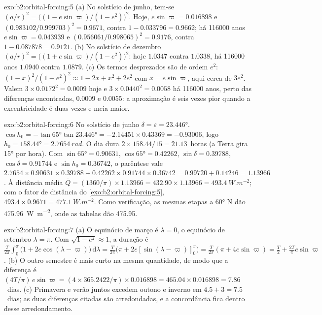\begin{solution}{exo:b2:orbital-forcing:5}
(a) No solstício de junho, tem-se $(a/r)^2 = \bigl((1 - e\sin\varpi)/(1 - e^2)\bigr)^2$. Hoje, $e\sin\varpi
= 0.016898$ e $(0.983102/0.999703)^2 = 0.9671$, contra $1 - 0.033796 = 0.9662$;
há \num{116000} anos $e\sin\varpi = 0.043939$ e $(0.956061/0.998065)^2 = 0.9176$, contra $1 -
0.087878 = 0.9121$. (b) No solstício de dezembro $(a/r)^2 = \bigl((1 + e\sin\varpi)/(1 -
e^2)\bigr)^2$: hoje $1.0347$ contra $1.0338$, há \num{116000} anos $1.0940$ contra $1.0879$.
(c) Os termos desprezados são de ordem $e^2$: $(1 - x)^2/(1 - e^2)^2 \approx 1 - 2x + x^2 + 2e^2$
com $x = e\sin\varpi$, aqui cerca de $3e^2$. Valem $3 \times 0.0172^2 = 0.0009$ hoje e $3
\times 0.0440^2 = 0.0058$ há \num{116000} anos, perto das diferenças encontradas, $0.0009$ e
$0.0055$: a aproximação é seis vezes pior quando a excentricidade é duas vezes e meia
maior.
\end{solution}

\begin{solution}{exo:b2:orbital-forcing:6}
No solstício de junho $\delta = \varepsilon = \ang{23.446}$. $\cos h_0 = -\tan\ang{65}\tan\ang{23.446}
= -2.14451 \times 0.43369 = -0.93006$, logo $h_0 = \ang{158.44} = \qty{2.7654}{rad}$. O dia dura
$2 \times 158.44/15 = 21.13$~horas (a Terra gira \ang{15} por hora). Com $\sin\ang{65} = 0.90631$,
$\cos\ang{65} = 0.42262$, $\sin\delta = 0.39788$, $\cos\delta = 0.91744$ e $\sin h_0 = 0.36742$,
o parêntese vale $2.7654 \times 0.90631 \times 0.39788 + 0.42262 \times 0.91744 \times 0.36742 = 0.99720
+ 0.14246 = 1.13966$. À distância média $\bar Q = (1360/\pi) \times 1.13966 = 432.90 \times 1.13966
= \qty{493.4}{W.m^{-2}}$; com o fator de distância do \cref{exo:b2:orbital-forcing:5}, $493.4 \times
0.9671 = \qty{477.1}{W.m^{-2}}$. Como verificação, as mesmas etapas a \ang{60} N dão \qty{475.96}{W.m^{-2}}, onde as tabelas dão \num{475.95}.
\end{solution}

\begin{solution}{exo:b2:orbital-forcing:7}
(a) O equinócio de março é $\lambda = 0$, o equinócio de setembro $\lambda = \pi$. Com $\sqrt{1 - e^2}
\approx 1$, a duração é $\frac{T}{2\pi}\int_0^{\pi}\bigl(1 + 2e\cos(\lambda -
\varpi)\bigr)\,\mathrm d\lambda = \frac{T}{2\pi}\bigl(\pi + 2e[\sin(\lambda - \varpi)]_0^{\pi}\bigr)
= \frac{T}{2\pi}(\pi + 4e\sin\varpi) = \frac T2 + \frac{2T}{\pi}e\sin\varpi$. (b) O outro semestre
é mais curto na mesma quantidade, de modo que a diferença é $(4T/\pi)\,e\sin\varpi = (4 \times
365.2422/\pi) \times 0.016898 = 465.04 \times 0.016898 = 7.86$~dias. (c) Primavera e verão juntos
excedem outono e inverno em $4.5 + 3 = 7.5$~dias; as duas diferenças citadas são arredondadas, e a
concordância fica dentro desse arredondamento.
\end{solution}

